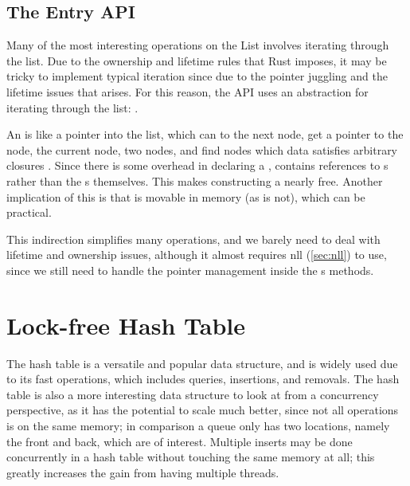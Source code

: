 \subsection{The Entry API}

Many of the most interesting operations on the List involves iterating through the list. Due to the
ownership and lifetime rules that Rust imposes, it may be tricky to implement typical iteration
since due to the pointer juggling and the lifetime issues that arises. For this reason, the API
uses an abstraction for iterating through the list: .

\begin{figure}[ht]

\end{figure}

An  is like a pointer into the list, which can  to the next node, get a
pointer to the  node,  the current node,  two
nodes, and find nodes which data satisfies arbitrary closures .  Since there is
some overhead in declaring a ,  contains references to s rather
than the s themselves. This makes constructing a  nearly free.  Another
implication of this is that  is movable in memory (as  is not), which can
be practical.

This indirection simplifies many operations, and we barely need to deal with lifetime and ownership
issues, although it almost requires \gls{nll} (\cref{sec:nll}) to use, since we still need to
handle the pointer management inside the s methods.

\begin{figure}[ht]

\end{figure}







\section{Lock-free Hash Table\label{sec:usage-hashmap}}

The hash table is a versatile and popular data structure, and is widely used due to its fast
operations, which includes queries, insertions, and removals. The hash table is also a more
interesting data structure to look at from a concurrency perspective, as it has the potential to
scale much better, since not all operations is on the same memory; in comparison a queue only has
two locations, namely the front and back, which are of interest. Multiple inserts may be done
concurrently in a hash table without touching the same memory at all; this greatly increases the
gain from having multiple threads.

